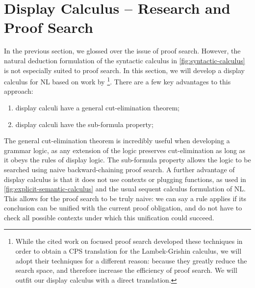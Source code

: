 \documentclass[a4paper]{article}
\begin{document}
\section{Display Calculus -- Research and Proof Search}\label{sec:display-calculus}
In the previous section, we glossed over the issue of proof
search. However, the natural deduction formulation of the syntactic
calculus in \autoref{fig:syntactic-calculus} is not especially suited
to proof search.
In this section, we will develop a display calculus
\citep{belnap1982} for NL based on work by
\citet{bernardi2010,bastenhof2012}\footnote{%
  While the cited work on focused proof search developed these
  techniques in order to obtain a CPS translation for the
  Lambek-Grishin calculus, we will adopt their techniques for a
  different reason: because they greatly reduce the search space, and
  therefore increase the efficiency of proof search. We will outfit
  our display calculus with a direct translation.
}. There are a few key advantages to this approach:
\begin{enumerate}
\item display calculi have a general cut-elimination theorem;
\item display calculi have the sub-formula property;
\end{enumerate}
The general cut-elimination theorem is incredibly useful when
developing a grammar logic, as any extension of the logic preserves
cut-elimination as long as it obeys the rules of display logic.
The sub-formula property allows the logic to be searched using naive
backward-chaining proof search. A further advantage of display
calculus is that it does not use contexts or plugging functions, as
used in \autoref{fig:explicit-semantic-calculus} and the usual sequent
calculus formulation of NL. This allows for the proof search to be
truly naive: we can say a rule applies if its conclusion can be
unified with the current proof obligation, and do not have to check
all possible contexts under which this unification could succeed.








\end{document}
